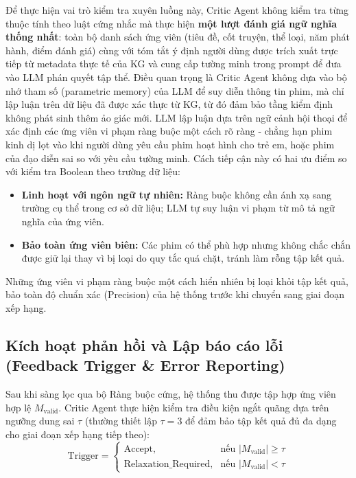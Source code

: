 Để thực hiện vai trò kiểm tra xuyên luồng này, Critic Agent không kiểm tra từng thuộc tính theo luật cứng nhắc mà thực hiện \textbf{một lượt đánh giá ngữ nghĩa thống nhất}: toàn bộ danh sách ứng viên (tiêu đề, cốt truyện, thể loại, năm phát hành, điểm đánh giá) cùng với tóm tắt ý định người dùng được trích xuất trực tiếp từ metadata thực tế của KG và cung cấp tường minh trong prompt để đưa vào LLM phán quyết tập thể. Điều quan trọng là Critic Agent không dựa vào bộ nhớ tham số (parametric memory) của LLM để suy diễn thông tin phim, mà chỉ lập luận trên dữ liệu đã được xác thực từ KG, từ đó đảm bảo tầng kiểm định không phát sinh thêm ảo giác mới. LLM lập luận dựa trên ngữ cảnh hội thoại để xác định các ứng viên vi phạm ràng buộc một cách rõ ràng - chẳng hạn phim kinh dị lọt vào khi người dùng yêu cầu phim hoạt hình cho trẻ em, hoặc phim của đạo diễn sai so với yêu cầu tường minh. Cách tiếp cận này có hai ưu điểm so với kiểm tra Boolean theo trường dữ liệu:
\begin{itemize}
    \item \textbf{Linh hoạt với ngôn ngữ tự nhiên:} Ràng buộc không cần ánh xạ sang trường cụ thể trong cơ sở dữ liệu; LLM tự suy luận vi phạm từ mô tả ngữ nghĩa của ứng viên.
    \item \textbf{Bảo toàn ứng viên biên:} Các phim có thể phù hợp nhưng không chắc chắn được giữ lại thay vì bị loại do quy tắc quá chặt, tránh làm rỗng tập kết quả.
\end{itemize}
Những ứng viên vi phạm ràng buộc một cách hiển nhiên bị loại khỏi tập kết quả, bảo toàn độ chuẩn xác (Precision) của hệ thống trước khi chuyển sang giai đoạn xếp hạng.

\subsection{Kích hoạt phản hồi và Lập báo cáo lỗi (Feedback Trigger \& Error Reporting)}
Sau khi sàng lọc qua bộ Ràng buộc cứng, hệ thống thu được tập hợp ứng viên hợp lệ $M_{\text{valid}}$. Critic Agent thực hiện kiểm tra điều kiện ngắt quãng dựa trên ngưỡng dung sai $\tau$ (thường thiết lập $\tau = 3$ để đảm bảo tập kết quả đủ đa dạng cho giai đoạn xếp hạng tiếp theo):
\begin{equation}
    \text{Trigger} =
    \begin{cases}
        \text{Accept},               & \text{nếu } |M_{\text{valid}}| \ge \tau \\
        \text{Relaxation\_Required}, & \text{nếu } |M_{\text{valid}}| < \tau
    \end{cases}
\end{equation}

